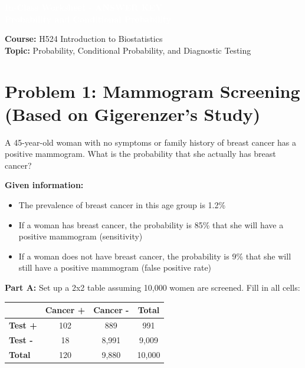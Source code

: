 \documentclass[11pt]{article}
\title{}
\author{}
\date{}
\begin{document}
\begin{tcolorbox}[colback=osaorange,colframe=black,boxrule=2pt,arc=0pt,left=6pt,right=6pt,top=10pt,bottom=10pt]
\centering
\textcolor{white}{\textbf{\Large In-Class Worksheet - ANSWER KEY}}\\
\textcolor{white}{\textbf{\large Probability and Conditional Probability}}
\end{tcolorbox}

\vspace{8pt}

\noindent\textbf{Course:} H524 Introduction to Biostatistics\\
\textbf{Topic:} Probability, Conditional Probability, and Diagnostic Testing

\vspace{8pt}

\section{Problem 1: Mammogram Screening (Based on Gigerenzer's Study)}

A 45-year-old woman with no symptoms or family history of breast cancer has a positive mammogram. What is the probability that she actually has breast cancer?

\vspace{6pt}

\textbf{Given information:}
\begin{itemize}
\item The prevalence of breast cancer in this age group is 1.2\%
\item If a woman has breast cancer, the probability is 85\% that she will have a positive mammogram (sensitivity)
\item If a woman does not have breast cancer, the probability is 9\% that she will still have a positive mammogram (false positive rate)
\end{itemize}

\vspace{12pt}

\textbf{Part A:} Set up a 2x2 table assuming 10,000 women are screened. Fill in all cells:

\vspace{12pt}

\begin{center}
\begin{tabular}{|l|c|c|c|}
\hline
& \textbf{Cancer +} & \textbf{Cancer -} & \textbf{Total} \\
\hline
\textbf{Test +} & 102 & 889 & 991 \\[2ex]
\hline
\textbf{Test -} & 18 & 8,991 & 9,009 \\[2ex]
\hline
\textbf{Total} & 120 & 9,880 & 10,000 \\[2ex]
\hline
\end{tabular}
\end{center}
\end{document}
